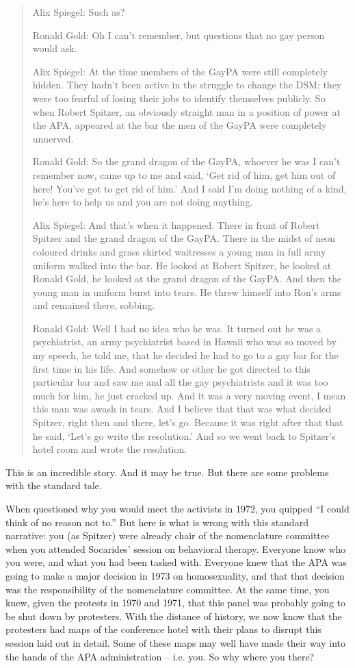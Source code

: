\begin{refsection}
\begin{quote}
Alix Spiegel: Such as?

Ronald Gold: Oh I can't remember, but questions that no gay person would ask.

Alix Spiegel: At the time members of the GayPA were still completely hidden. They hadn't been active in the struggle to change the DSM; they were too fearful of losing their jobs to identify themselves publicly. So when Robert Spitzer, an obviously straight man in a position of power at the APA, appeared at the bar the men of the GayPA were completely unnerved.

Ronald Gold: So the grand dragon of the GayPA, whoever he was I can't remember now, came up to me and said, `Get rid of him, get him out of here! You've got to get rid of him.' And I said I'm doing nothing of a kind, he's here to help us and you are not doing anything.

Alix Spiegel: And that's when it happened. There in front of Robert Spitzer and the grand dragon of the GayPA. There in the midst of neon coloured drinks and grass skirted waitresses a young man in full army uniform walked into the bar. He looked at Robert Spitzer, he looked at Ronald Gold, he looked at the grand dragon of the GayPA. And then the young man in uniform burst into tears. He threw himself into Ron's arms and remained there, sobbing.

Ronald Gold: Well I had no idea who he was. It turned out he was a psychiatrist, an army psychiatrist based in Hawaii who was so moved by my speech, he told me, that he decided he had to go to a gay bar for the first time in his life. And somehow or other he got directed to this particular bar and saw me and all the gay psychiatrists and it was too much for him, he just cracked up. And it was a very moving event, I mean this man was awash in tears. And I believe that that was what decided Spitzer, right then and there, let's go. Because it was right after that that he said, `Let's go write the resolution.' And so we went back to Spitzer's hotel room and wrote the resolution.
\end{quote}

This is an incredible story. And it may be true. But there are some problems with the standard tale.

When questioned why you would meet the activists in 1972, you quipped “I could think of no reason not to.” But here is what is wrong with this standard narrative: you (as Spitzer) were already chair of the nomenclature committee when you attended Socarides' session on behavioral therapy. Everyone know who you were, and what you had been tasked with. Everyone knew that the APA was going to make a major decision in 1973 on homosexuality, and that that decision was the responsibility of the nomenclature committee. At the same time, you knew, given the protests in 1970 and 1971, that this panel was probably going to be shut down by protesters. With the distance of history, we now know that the protesters had maps of the conference hotel with their plans to disrupt this session laid out in detail. Some of these maps may well have made their way into the hands of the APA administration – i.e. you. So why where you there?


\end{refsection}
